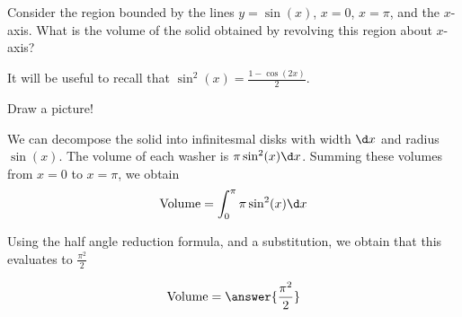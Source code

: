 \documentclass{ximera}
\author{Steven Gubkin}
\begin{document}
\begin{exercise}



Consider the region bounded by the lines $y = \sin(x)$, $x=0$,
$x=\pi$, and the $x$-axis.  What is the volume of the solid obtained
by revolving this region about $x$-axis?

It will be useful to recall that $\sin^2(x) = \frac{1-\cos(2x)}{2}$.

\begin{hint}
  Draw a picture!
\end{hint}

\begin{hint}
  We can decompose the solid into infinitesmal disks with width
  $\d x$ and radius $\sin(x)$. The volume of each washer is $\pi
  \sin^2(x)\d x$.  Summing these volumes from $x=0$ to $x=\pi$,
  we obtain
  \[
  \textrm{Volume} = \int_0^\pi \pi \sin^2(x)\d x
  \]
\end{hint}

\begin{hint}
  Using the half angle reduction formula, and a substitution, we obtain that this evaluates to $\frac{\pi^2}{2}$
\end{hint}

\begin{prompt}
  \[
  \textrm{Volume} = \answer{\frac{\pi^2}{2}}
  \]
\end{prompt}

\end{exercise}
\end{document}
